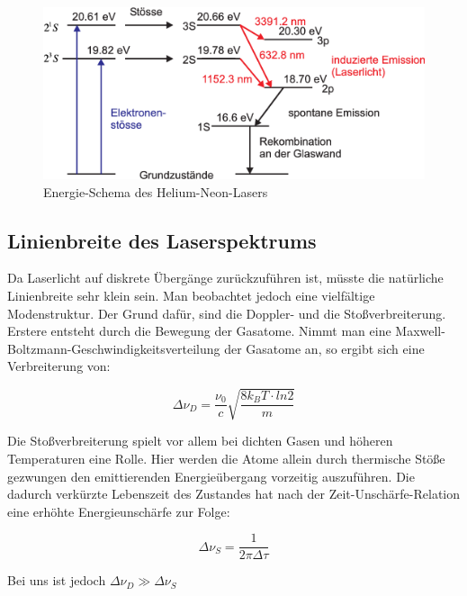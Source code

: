 \begin{figure}[here]
\centering
\includegraphics[scale=0.4]{img/HNL8}
\caption{Energie-Schema des Helium-Neon-Lasers}
\begin{center}
\end{center}
\end{figure}

\subsection{Linienbreite des Laserspektrums}
Da Laserlicht auf diskrete Übergänge zurückzuführen ist, müsste die natürliche Linienbreite sehr klein sein. Man beobachtet jedoch eine vielfältige Modenstruktur. Der Grund dafür, sind die Doppler- und die Stoßverbreiterung. Erstere entsteht durch die Bewegung der Gasatome. Nimmt man eine Maxwell-Boltzmann-Geschwindigkeitsverteilung der Gasatome an, so ergibt sich eine Verbreiterung von:

\begin{equation}
\Delta \nu_D = \frac{\nu_0}{c}\sqrt{\frac{8k_BT\cdot ln 2}{m}}
\end{equation}

Die Stoßverbreiterung spielt vor allem bei dichten Gasen und höheren Temperaturen eine Rolle. Hier werden die Atome allein durch thermische  Stöße gezwungen den emittierenden Energieübergang vorzeitig auszuführen. Die dadurch verkürzte Lebenszeit des Zustandes hat nach der Zeit-Unschärfe-Relation eine erhöhte Energieunschärfe zur Folge:

\begin{equation}
\Delta \nu_S = \frac{1}{2\pi \Delta \tau}
\end{equation}

Bei uns ist jedoch $\Delta \nu_D \gg \Delta \nu_S$